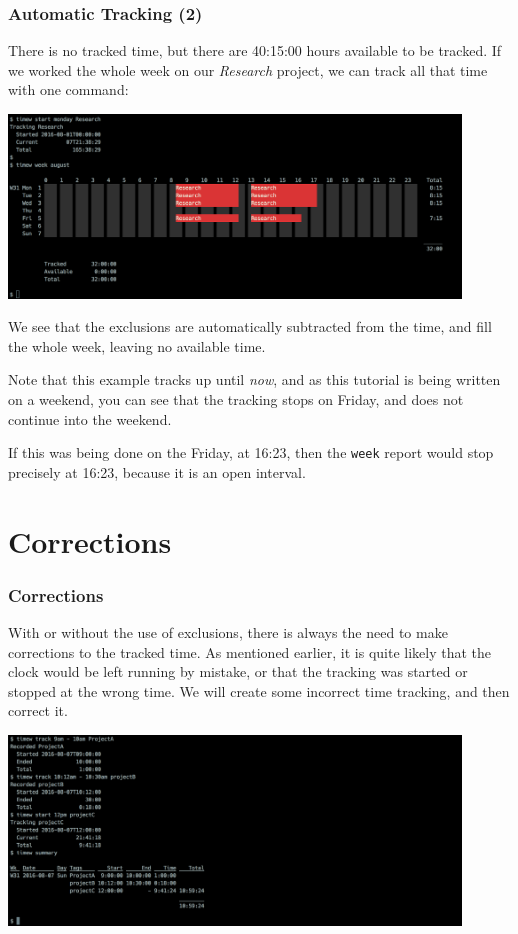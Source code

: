 \documentclass[t,handout]{beamer}
\begin{document}
\begin{frame}[fragile]\frametitle{Automatic Tracking (2)}
    \vfill
    There is no tracked time, but there are 40:15:00 hours available to be tracked.  If we worked the whole week on our \textit{Research} project, we can track all that time with one command:

    \includegraphics[width=12cm]{images/tutorial36.png}

    We see that the exclusions are automatically subtracted from the time, and fill the whole week, leaving no available time.

    Note that this example tracks up until \textit{now}, and as this tutorial is being written on a weekend, you can see that the tracking stops on Friday, and does not continue into the weekend.

    If this was being done on the Friday, at 16:23, then the \verb=week= report would stop precisely at 16:23, because it is an open interval.
\end{frame}

\section{Corrections}

\begin{frame}[fragile]\frametitle{Corrections}
    \vfill
    With or without the use of exclusions, there is always the need to make corrections to the tracked time. As mentioned earlier, it is quite likely that the clock would be left running by mistake, or that the tracking was started or stopped at the wrong time. We will create some incorrect time tracking, and then correct it.

    \includegraphics[width=12cm]{images/tutorial37.png}
\end{frame}
\end{document}
